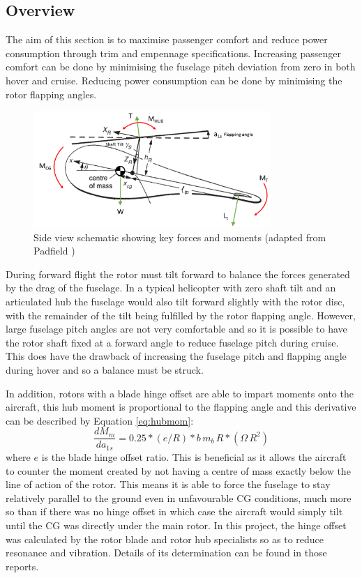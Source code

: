 \documentclass[11pt,a4paper]{article}
\begin{document}
\subsection{Overview}
The aim of this section is to maximise passenger comfort and reduce power consumption through trim and empennage specifications. Increasing passenger comfort can be done by minimising the fuselage pitch deviation from zero in both hover and cruise. Reducing power consumption can be done by minimising the rotor flapping angles.
\begin{figure}[H]
    \centering
    \includegraphics[width=0.8\textwidth]{FBD.PNG}
    \caption{Side view schematic showing key forces and moments (adapted from Padfield \cite{padfield})}
    \label{fig:fbd}
\end{figure}{}

During forward flight the rotor must tilt forward to balance the forces generated by the drag of the fuselage.
In a typical helicopter with zero shaft tilt and an articulated hub the fuselage would also tilt forward slightly with the rotor disc, with the remainder of the tilt being fulfilled by the rotor flapping angle. 
However, large fuselage pitch angles are not very comfortable and so it is possible to have the rotor shaft fixed at a forward angle to reduce fuselage pitch during cruise. This does have the drawback of increasing the fuselage pitch and flapping angle during hover and so a balance must be struck.

In addition, rotors with a blade hinge offset are able to impart moments onto the aircraft, this hub moment is proportional to the flapping angle and this derivative can be described by Equation \ref{eq:hubmom}:
\begin{equation}
    \frac{dM_m}{da_{1s}}=0.25*(e/R)*b\,m_b\,R*(\Omega\,R^2) \label{eq:hubmom}
\end{equation}{}
where $e$ is the blade hinge offset ratio\cite{prouty}.
This is beneficial as it allows the aircraft to counter the moment created by not having a centre of mass exactly below the line of action of the rotor. This means it is able to force the fuselage to stay relatively parallel to the ground even in unfavourable CG conditions, much more so than if there was no hinge offset in which case the aircraft would simply tilt until the CG was directly under the main rotor. In this project, the hinge offset was calculated by the rotor blade and rotor hub specialists so as to reduce resonance and vibration. Details of its determination can be found in those reports.
\end{document}
